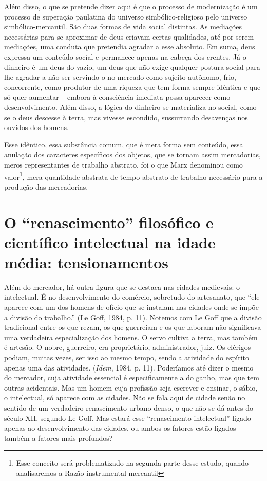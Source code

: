 Além disso, o que se pretende dizer aqui é que o processo de
modernização é um processo de superação paulatina do universo
simbólico-religioso pelo universo simbólico-mercantil. São duas formas
de vida social distintas. As mediações necessárias para se aproximar de
deus criavam certas qualidades, até por serem mediações, uma conduta que
pretendia agradar a esse absoluto. Em suma, deus expressa um conteúdo
social e permanece apenas na cabeça dos crentes. Já o dinheiro é um deus
do vazio, um deus que não exige qualquer postura social para lhe agradar
a não ser servindo-o no mercado como sujeito autônomo, frio,
concorrente, como produtor de uma riqueza que tem forma sempre idêntica
e que só quer aumentar -- embora à consciência imediata possa aparecer
como desenvolvimento. Além disso, a lógica do dinheiro se materializa no
social, como se o deus descesse à terra, mas vivesse escondido,
sussurrando desavenças nos ouvidos dos homens.

Esse idêntico, essa substância comum, que é mera forma sem conteúdo,
essa anulação dos caracteres específicos dos objetos, que se tornam
assim mercadorias, meros representantes de trabalho abstrato, foi o que
Marx denominou como valor\footnote{Esse conceito será problematizado na
  segunda parte desse estudo, quando analisaremos a Razão
  instrumental-mercantil}, mera quantidade abstrata de tempo abstrato de
trabalho necessário para a produção das mercadorias.

\section{O ``renascimento'' filosófico e científico intelectual na idade média: tensionamentos}

Além do mercador, há outra figura que se destaca nas cidades medievais:
o intelectual. É no desenvolvimento do comércio, sobretudo do
artesanato, que ``ele aparece com um dos homens de ofício que se
instalam nas cidades onde se impõe a divisão do trabalho.'' (Le Goff,
1984, p. 11). Notemos com Le Goff que a divisão tradicional entre os que
rezam, os que guerreiam e os que laboram não significava uma verdadeira
especialização dos homens. O servo cultiva a terra, mas também é
artesão. O nobre, guerreiro, era proprietário, administrador, juiz. Os
clérigos podiam, muitas vezes, ser isso ao mesmo tempo, sendo a
atividade do espírito apenas uma das atividades. (\emph{Idem}, 1984, p.
11). Poderíamos até dizer o mesmo do mercador, cuja atividade essencial
é especificamente a do ganho, mas que tem outras acidentais. Mas um
homem cuja profissão seja escrever e ensinar, o sábio, o intelectual, só
aparece com as cidades. Não se fala aqui de cidade senão no sentido de
um verdadeiro renascimento urbano denso, o que não se dá antes do século
XII, segundo Le Goff. Mas estará esse ``renascimento intelectual''
ligado apenas ao desenvolvimento das cidades, ou ambos os fatores estão
ligados também a fatores mais profundos?

